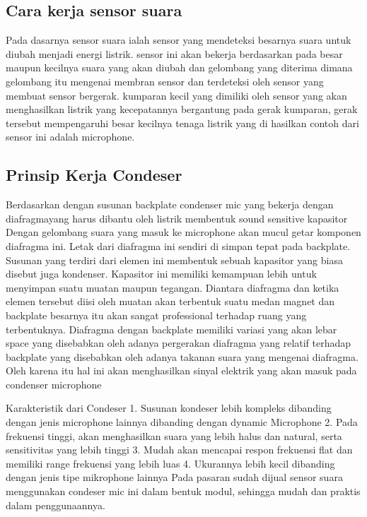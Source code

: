 \subsection {Cara kerja sensor suara}

Pada dasarnya sensor suara ialah sensor yang mendeteksi besarnya suara untuk diubah menjadi energi listrik. sensor ini akan bekerja berdasarkan pada besar maupun kecilnya suara yang akan diubah dan gelombang yang diterima dimana gelombang itu mengenai membran sensor dan terdeteksi oleh sensor yang membuat sensor bergerak. kumparan kecil yang dimiliki oleh sensor yang akan menghasilkan listrik yang kecepatannya bergantung pada gerak kumparan, gerak tersebut mempengaruhi besar kecilnya tenaga listrik yang di hasilkan contoh dari sensor ini adalah microphone.

\subsection {Prinsip Kerja Condeser}
Berdasarkan dengan susunan backplate condenser mic yang bekerja dengan diafragmayang harus dibantu oleh listrik membentuk sound sensitive kapasitor  Dengan gelombang suara yang masuk ke microphone akan mucul getar komponen diafragma ini. Letak dari diafragma ini sendiri di simpan tepat pada backplate. Susunan yang terdiri dari elemen ini membentuk sebuah kapasitor yang biasa disebut juga kondenser. Kapasitor ini memiliki kemampuan lebih untuk menyimpan suatu muatan maupun tegangan. Diantara diafragma dan ketika elemen tersebut diisi oleh muatan akan terbentuk suatu medan magnet dan backplate besarnya itu akan sangat professional terhadap ruang yang terbentuknya. Diafragma dengan backplate memiliki variasi yang akan lebar space yang disebabkan oleh adanya pergerakan diafragma yang relatif terhadap backplate yang disebabkan oleh adanya takanan suara yang mengenai diafragma. Oleh karena itu hal ini akan menghasilkan sinyal elektrik yang akan masuk pada condenser microphone

Karakteristik dari Condeser
1. Susunan kondeser lebih kompleks dibanding dengan jenis microphone lainnya dibanding dengan dynamic Microphone
2. Pada frekuensi tinggi, akan menghasilkan suara yang lebih halus dan natural, serta sensitivitas yang lebih tinggi
3. Mudah akan mencapai respon frekuensi flat dan memiliki range frekuensi yang lebih luas
4. Ukurannya lebih kecil dibanding dengan jenis tipe mikrophone lainnya
Pada pasaran sudah dijual sensor suara menggunakan condeser mic ini dalam bentuk modul, sehingga mudah dan praktis dalam penggunaannya.

